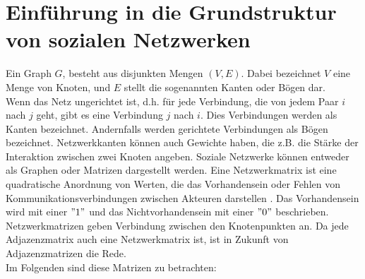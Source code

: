 \section{Einführung in die Grundstruktur von sozialen Netzwerken}
Ein Graph $G$, besteht aus disjunkten Mengen $(V ,E)$. Dabei bezeichnet $V$ eine Menge von Knoten, und $E$ stellt die sogenannten Kanten oder Bögen dar.\\
Wenn das Netz ungerichtet ist, d.h. für jede Verbindung, die von jedem Paar $i$ nach $j$ geht, gibt es eine Verbindung $j$ nach $i$. Dies Verbindungen werden als Kanten bezeichnet. Andernfalls werden gerichtete Verbindungen
als Bögen bezeichnet. Netzwerkkanten können auch Gewichte haben, die z.B. die Stärke der Interaktion zwischen zwei Knoten angeben.
Soziale Netzwerke können entweder als Graphen oder Matrizen dargestellt werden. Eine Netzwerkmatrix ist eine quadratische Anordnung von Werten, die das Vorhandensein oder Fehlen von Kommunikationsverbindungen zwischen Akteuren darstellen \cite{Hanneman}. Das Vorhandensein wird mit einer $"1"$ und das Nichtvorhandensein mit einer $"0"$ beschrieben. Netzwerkmatrizen geben Verbindung zwischen den Knotenpunkten an. Da jede Adjazenzmatrix auch eine Netzwerkmatrix ist, ist in Zukunft von Adjazenzmatrizen die Rede. \\
Im Folgenden sind diese Matrizen zu betrachten: \\
 
